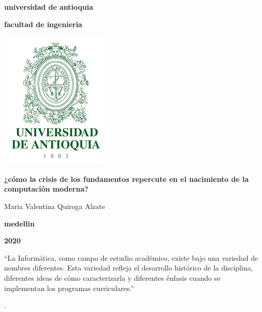 \documentclass[12pt]{article}
\begin{document}
\begin{center}
\bf{\sc\LARGE universidad de antioquia}\\
\end{center}
\begin{center}
\bf{\sc\LARGE facultad de ingenieria}
\end{center}
\begin{center}
    \includegraphics{escudo}
\end{center}
\begin{center}
    \bf{\sc\LARGE ¿cómo la crisis de los fundamentos repercute en el nacimiento de la computación moderna?}\\[2.5cm]
\end{center}
\begin{center}
    {\large Maria Valentina Quiroga Alzate}\\
\end{center}
\begin{center}
\bf{\sc\large medellin }\\
\end{center}
\begin{center}
\bf{\sc\large 2020 }\\
\end{center}
\newpage

\begin{center}

\end{center}
\begin{flushleft}
``La Informática, como campo de estudio académico, existe bajo una variedad de nombres diferentes. Esta variedad
refleja el desarrollo histórico de la disciplina, diferentes ideas de cómo caracterizarla y diferentes énfasis cuando se
implementan los programas curriculares.''



\cite{barchini2004informatica}.
\end{flushleft}
\end{document}
